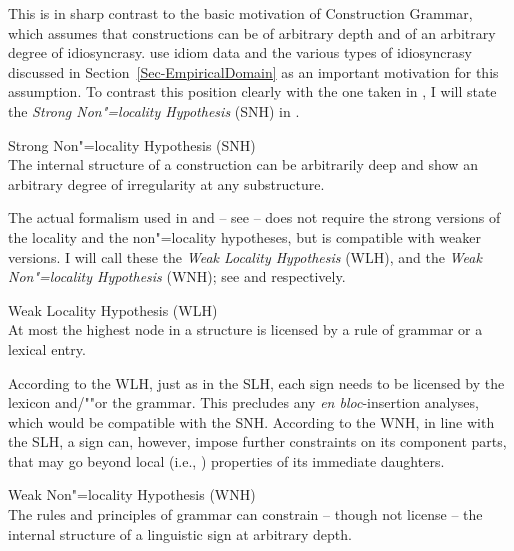 \documentclass[output=paper,biblatex,babelshorthands,newtxmath,draftmode,colorlinks,citecolor=brown]{langscibook}
\begin{document}
\largerpage[1.3]
This is in sharp contrast to the basic motivation of Construction Grammar\indexcxg, which assumes
that constructions can be of arbitrary depth and of an arbitrary degree of idiosyncrasy.
\citet{FKoC88a} use idiom data and the various types of idiosyncrasy discussed in
Section~\ref{Sec-EmpiricalDomain} as an important motivation for this assumption.  To contrast this
position clearly with the one taken in \citet{ps2}, I will state the \emph{Strong Non"=locality
  Hypothesis} (SNH) in .

\eanoraggedright
Strong Non"=locality Hypothesis (SNH)\label{snh}\\
The internal structure of a construction can be arbitrarily deep and show an arbitrary degree of irregularity at any substructure.
\z


The actual formalism used in \citet{ps2} and \citet{King89} -- see
 -- does not require the strong versions of the locality and the
non"=locality hypotheses, but is compatible with weaker versions. I will call these the \emph{Weak
  Locality Hypothesis} (WLH), and the \emph{Weak Non"=locality
  Hypothesis} (WNH); see  and  respectively.

\eanoraggedright
Weak Locality Hypothesis (WLH)\label{wlh}\\
At most the highest node in a structure is licensed by a rule of grammar or a lexical entry.
\z 

According to the WLH, just as in the SLH, each sign needs to be licensed by the lexicon and/""or the grammar. 
This precludes any \emph{en bloc}-insertion analyses, which would be compatible with the SNH.
%
According to the WNH, in line with the SLH, a sign can, however, impose further constraints on its
component parts, that may go beyond local (i.e., ) properties of its immediate
daughters. 

\eanoraggedright
Weak Non"=locality Hypothesis (WNH)\label{wnh}\\
The rules and principles of grammar can constrain -- though not license -- the internal structure of a linguistic sign at arbitrary depth.
\z 
\end{document}
